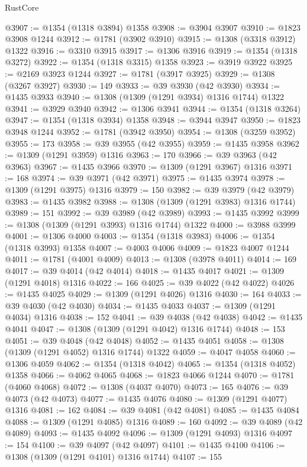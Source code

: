 \begin{lexlean}{RustCore}
\begin{coremodule}
@3907 := @1354 (@1318 @3894) @1358
@3908 := @3904 @3907
@3910 := @1823 @3908 @1244
@3912 := @1781 (@3902 @3910)
@3915 := @1308 (@3318 @3912) @1322
@3916 := @3310 @3915
@3917 := @1306 @3916
@3919 := @1354 (@1318 @3272)
@3922 := @1354 (@1318 @3315) @1358
@3923 := @3919 @3922
@3925 := @2169 @3923 @1244
@3927 := @1781 (@3917 @3925)
@3929 := @1308 (@3267 @3927)
@3930 := 149
@3933 := @39 @3930 (@42 @3930)
@3934 := @1435 @3933
@3940 := @1308 (@1309 (@1291 @3934) @1316 @1744) @1322
@3941 := @3929 @3940
@3942 := @1306 @3941
@3944 := @1354 (@1318 @3264)
@3947 := @1354 (@1318 @3934) @1358
@3948 := @3944 @3947
@3950 := @1823 @3948 @1244
@3952 := @1781 (@3942 @3950)
@3954 := @1308 (@3259 @3952)
@3955 := 173
@3958 := @39 @3955 (@42 @3955)
@3959 := @1435 @3958
@3962 := @1309 (@1291 @3959) @1316
@3963 := 170
@3966 := @39 @3963 (@42 @3963)
@3967 := @1435 @3966
@3970 := @1309 (@1291 @3967) @1316
@3971 := 168
@3974 := @39 @3971 (@42 @3971)
@3975 := @1435 @3974
@3978 := @1309 (@1291 @3975) @1316
@3979 := 150
@3982 := @39 @3979 (@42 @3979)
@3983 := @1435 @3982
@3988 := @1308 (@1309 (@1291 @3983) @1316 @1744)
@3989 := 151
@3992 := @39 @3989 (@42 @3989)
@3993 := @1435 @3992
@3999 := @1308 (@1309 (@1291 @3993) @1316 @1744) @1322
@4000 := @3988 @3999
@4001 := @1306 @4000
@4003 := @1354 (@1318 @3983)
@4006 := @1354 (@1318 @3993) @1358
@4007 := @4003 @4006
@4009 := @1823 @4007 @1244
@4011 := @1781 (@4001 @4009)
@4013 := @1308 (@3978 @4011)
@4014 := 169
@4017 := @39 @4014 (@42 @4014)
@4018 := @1435 @4017
@4021 := @1309 (@1291 @4018) @1316
@4022 := 166
@4025 := @39 @4022 (@42 @4022)
@4026 := @1435 @4025
@4029 := @1309 (@1291 @4026) @1316
@4030 := 164
@4033 := @39 @4030 (@42 @4030)
@4034 := @1435 @4033
@4037 := @1309 (@1291 @4034) @1316
@4038 := 152
@4041 := @39 @4038 (@42 @4038)
@4042 := @1435 @4041
@4047 := @1308 (@1309 (@1291 @4042) @1316 @1744)
@4048 := 153
@4051 := @39 @4048 (@42 @4048)
@4052 := @1435 @4051
@4058 := @1308 (@1309 (@1291 @4052) @1316 @1744) @1322
@4059 := @4047 @4058
@4060 := @1306 @4059
@4062 := @1354 (@1318 @4042)
@4065 := @1354 (@1318 @4052) @1358
@4066 := @4062 @4065
@4068 := @1823 @4066 @1244
@4070 := @1781 (@4060 @4068)
@4072 := @1308 (@4037 @4070)
@4073 := 165
@4076 := @39 @4073 (@42 @4073)
@4077 := @1435 @4076
@4080 := @1309 (@1291 @4077) @1316
@4081 := 162
@4084 := @39 @4081 (@42 @4081)
@4085 := @1435 @4084
@4088 := @1309 (@1291 @4085) @1316
@4089 := 160
@4092 := @39 @4089 (@42 @4089)
@4093 := @1435 @4092
@4096 := @1309 (@1291 @4093) @1316
@4097 := 154
@4100 := @39 @4097 (@42 @4097)
@4101 := @1435 @4100
@4106 := @1308 (@1309 (@1291 @4101) @1316 @1744)
@4107 := 155

\end{coremodule}
\end{lexlean}
